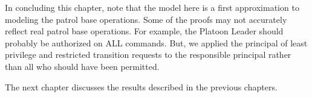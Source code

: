 \documentclass[../../main/main.tex]{subfiles}
\begin{document}
\HOLssmPlanPBTheoremsPlatoonSergeantXXtrapXXplCommandXXjustifiedXXlemma

\HOLssmPlanPBTheoremsPlatoonSergeantXXtrapXXplCommandXXjustifiedXXthm

In concluding this chapter, note that the model here is a first approximation to modeling the patrol base operations.  Some of the proofs may not accurately reflect real patrol base operations.  For example, the Platoon Leader should probably be authorized on ALL commands.  But, we applied the principal of least privilege and restricted transition requests to the responsible principal rather than all who should have been permitted.

The next chapter discusses the results described in the previous chapters.
\end{document}
